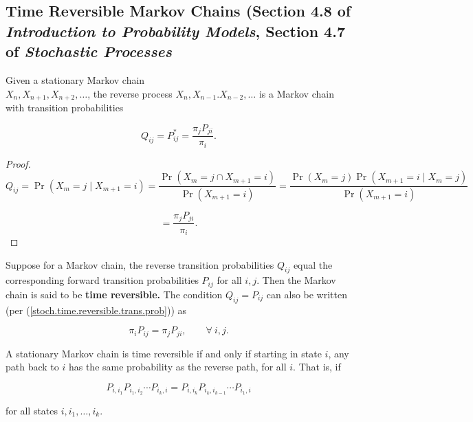 \subsection{Time Reversible Markov Chains (Section 4.8 of \textit{Introduction to Probability Models}, Section 4.7 of \textit{Stochastic Processes}}

\begin{proposition}Given a stationary Markov chain \\ \(X_n, X_{n+1}, X_{n+2}, \ldots\), the reverse process \(X_n, X_{n-1}. X_{n-2}, \ldots\) is a Markov chain with transition probabilities

\[
Q_{ij} = P_{ij}^* = \frac{ \pi_j P_{ji}}{\pi_i}.
\]

\end{proposition}

\begin{proof}

\[
Q_{ij} = \Pr(X_m = j \mid X_{m+1} = i) = \frac{ \Pr(X_m = j \cap X_{m+1} = i) }{\Pr(X_{m+1} = i)} = \frac{ \Pr(X_m = j ) \Pr( X_{m+1} = i \mid X_m=j) }{\Pr(X_{m+1} = i)}
\]

\begin{equation}\label{stoch.time.reversible.trans.prob}
= \frac{\pi_j P_{ji}}{\pi_i}.
\end{equation}

\end{proof}

\begin{definition}Suppose for a Markov chain, the reverse transition probabilities \(Q_{ij}\) equal the corresponding forward transition probabilities \(P_{ij}\) for all \(i, j\). Then the Markov chain is said to be \textbf{time reversible.} The condition \(Q_{ij} = P_{ij}\) can also be written (per (\ref{stoch.time.reversible.trans.prob})) as

\[
\pi_i P_{ij} = \pi_j P_{ji}, \qquad \forall \ i,j.
\]

\end{definition}

\begin{theorem}A stationary Markov chain is time reversible if and only if starting in state \(i\), any path back to \(i\) has the same probability as the reverse path, for all \(i\). That is, if 

\[
P_{i,i_1}P_{i_1,i_2} \cdots P_{i_k,i} = P_{i,i_k} P_{i_k,i_{k-1}} \cdots P_{i_1, i}
\]

for all states \(i, i_1, \ldots, i_k\).

\end{theorem}

